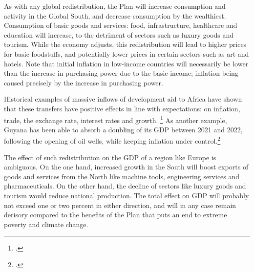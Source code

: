 \documentclass[a5paper,english,openany]{memoir}
\begin{document}
As with any global redistribution, the Plan will increase consumption and activity in the Global South, and decrease consumption by the wealthiest. Consumption of basic goods and services: food, infrastructure, healthcare and education  %
will increase, to the detriment of sectors such as luxury goods and tourism. While the economy adjusts, this redistribution will lead to higher prices for basic foodstuffs, and potentially lower prices in certain sectors such as art and hotels. %
Note that initial inflation in low-income countries will necessarily be lower than the increase in purchasing power due to the basic income; inflation being caused precisely by the increase in purchasing power. %

Historical examples of massive inflows of development aid to Africa have shown that these transfers have positive effects in line with expectations: on inflation, trade, the exchange rate, interest rates %
and growth. %
\footnote{\citet{berg_macroeconomics_2007,strand_revenue_2009}.} As another example, Guyana has been able to absorb a doubling of its GDP between 2021 and 2022, following the opening of oil wells, %
while keeping inflation under control.\footnote{\citet{fmi_guyana_2023}.} 

The effect of such redistribution on the GDP of a region like Europe is ambiguous. On the one hand, increased growth in the South will boost exports of goods and services from the North  like machine tools, engineering services %
and pharmaceuticals. %
On the other hand, the decline of sectors like luxury goods and tourism would reduce national production. 
The total effect on GDP will probably not exceed one or two percent in either direction, and will in any case remain derisory compared to the benefits of the Plan that puts an end to extreme poverty and climate change. %
\end{document}
